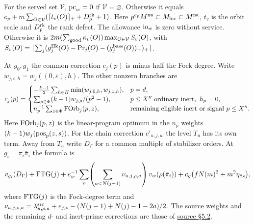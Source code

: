 \documentclass[letterpaper,11pt]{article}
\newcommand{\paperpage}[2]{\href{https://zenodo.org/records/24413008/files/alpoge-rh-exposition.pdf\#page=#1}{#2}}
\begin{document}
For the served set \(\mathcal V\), \({\rm pc}_w=0\) if \(\mathcal V=\varnothing\). Otherwise it equals \(e_p+m\sum_{O\in\mathcal V}(\lceil t_v(O)\rceil_++D_p^{\rm rk}+1)\). Here \(p^{e_p}M^{\rm na}\subset M_{\rm loc}\subset M^{\rm na}\), \(t_v\) is the orbit scale and \(D_p^{\rm rk}\) the rank defect. The allowance \({\rm io}_w\) is zero without service. Otherwise it is
\(2m(\sum_{\rm good}\kappa_v(O))\max_{O\in\mathcal V}S_v(O)\), with
\(S_v(O)=\lceil\sum_j(g_j^{\rm Hk}(O)-{\rm Pr}_j(O)-(g_j^{\rm base}(O))_+)_+\rceil\).

At \(g_0,g_1\) the common correction \(c_j(p)\) is minus half the Fock degree. Write \(w_{j,\varepsilon,h}=w_j((0,\varepsilon),h)\). The other nonzero branches are
\[
 c_j(p)=
 \begin{cases}
 -\tfrac{k-1}{2}\sum_{h\in H}\min(w_{j,0,h},w_{j,1,h}), &p=d,\\
 \sum_{\rho\in\Phi}(k-1)w_{j,\rho}/(p^2-1), &p\le X''\text{ ordinary inert},\ h_p=0,\\
 n_p^{-1}\sum_{z\in\Phi}{\rm FOrb}_j(p,z), &\text{remaining eligible inert or signal }p\le X''.
 \end{cases}
\]
Here \({\rm FOrb}_j(p,z)\) is the linear-program optimum in the \(n_p\) weights \((k-1)w_j({\rm pos}_p(z,s))\). For the chain correction \(c'_{u,j,w}\) the level \(T_u\) has its own term. Away from \(T_u\) write \(D_\Gamma\) for a common multiple of stabilizer orders. At \(g_i=\pi_i\bar\pi_i\) the formula is
\[
 v_{g_i}(D_\Gamma)+{\rm FTG}(j)
 +e_w^{-1}\sum_\rho\!\left(\sum_{a<N(j-1)}\nu_{u,j,\rho,a}\right)v_w(\rho(\bar\pi_i))
 +c_g\big(fN(m)^2+m^2\eta_{\rm Sz}\big),
\]
where \({\rm FTG}(j)\) is the Fock-degree term and
\(\nu_{u,j,\rho,a}=\lambda^{\rm src}_{u,\rho,a}+e_{j,\rho}-(N(j-1)+N(j)-1-2a)/2\).
The source weights and the remaining \(d\)- and inert-prime corrections are those of \paperpage{20}{source \S5.2}.
\end{document}
